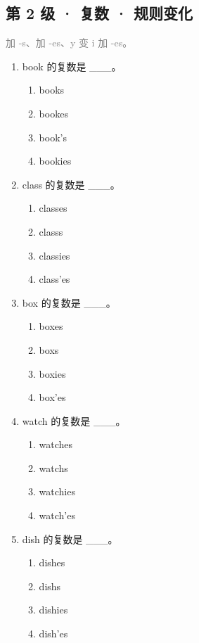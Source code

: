 \documentclass[11pt,a4paper]{ctexart}
\begin{document}
\subsection*{第 2 级 · 复数 · 规则变化}
\noindent\textcolor{gray}{加 -s、加 -es、y 变 i 加 -es。}\par\smallskip
\begin{enumerate}[leftmargin=*,itemsep=4pt]
\item book 的复数是 \_\_\_。
\begin{enumerate}[label=\Alph*.,leftmargin=2em,itemsep=1pt,topsep=2pt]
\item books
\item bookes
\item book’s
\item bookies
\end{enumerate}
\item class 的复数是 \_\_\_。
\begin{enumerate}[label=\Alph*.,leftmargin=2em,itemsep=1pt,topsep=2pt]
\item classes
\item classs
\item classies
\item class’es
\end{enumerate}
\item box 的复数是 \_\_\_。
\begin{enumerate}[label=\Alph*.,leftmargin=2em,itemsep=1pt,topsep=2pt]
\item boxes
\item boxs
\item boxies
\item box’es
\end{enumerate}
\item watch 的复数是 \_\_\_。
\begin{enumerate}[label=\Alph*.,leftmargin=2em,itemsep=1pt,topsep=2pt]
\item watches
\item watchs
\item watchies
\item watch’es
\end{enumerate}
\item dish 的复数是 \_\_\_。
\begin{enumerate}[label=\Alph*.,leftmargin=2em,itemsep=1pt,topsep=2pt]
\item dishes
\item dishs
\item dishies
\item dish’es
\end{enumerate}

\end{enumerate}
\end{document}
